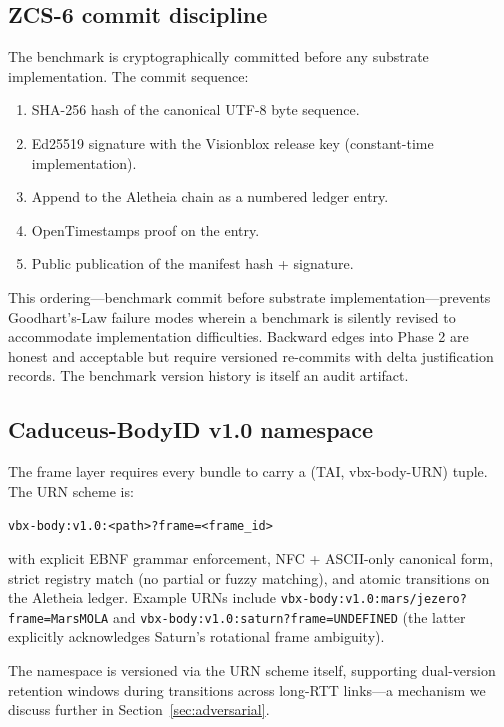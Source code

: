 \documentclass[conference]{IEEEtran}
\begin{document}
\subsection{ZCS-6 commit discipline}

The benchmark is cryptographically committed before any substrate implementation. The commit sequence:

\begin{enumerate}
    \item SHA-256 hash of the canonical UTF-8 byte sequence.
    \item Ed25519 signature with the Visionblox release key (constant-time implementation).
    \item Append to the Aletheia chain as a numbered ledger entry.
    \item OpenTimestamps proof on the entry.
    \item Public publication of the manifest hash + signature.
\end{enumerate}

This ordering---benchmark commit before substrate implementation---prevents Goodhart's-Law failure modes wherein a benchmark is silently revised to accommodate implementation difficulties. Backward edges into Phase 2 are honest and acceptable but require versioned re-commits with delta justification records. The benchmark version history is itself an audit artifact.

\subsection{Caduceus-BodyID v1.0 namespace}

The frame layer requires every bundle to carry a (TAI, vbx-body-URN) tuple. The URN scheme is:

\begin{center}
\texttt{vbx-body:v1.0:<path>?frame=<frame\_id>}
\end{center}

with explicit EBNF grammar enforcement, NFC + ASCII-only canonical form, strict registry match (no partial or fuzzy matching), and atomic transitions on the Aletheia ledger. Example URNs include \texttt{vbx-body:v1.0:mars/jezero?frame=MarsMOLA} and \texttt{vbx-body:v1.0:saturn?frame=UNDEFINED} (the latter explicitly acknowledges Saturn's rotational frame ambiguity).

The namespace is versioned via the URN scheme itself, supporting dual-version retention windows during transitions across long-RTT links---a mechanism we discuss further in Section~\ref{sec:adversarial}.
\end{document}
